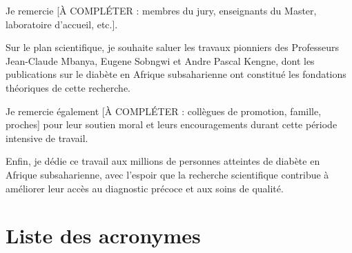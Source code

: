 \documentclass[12pt,a4paper,oneside]{report}
\begin{document}
\vspace{0.3cm}

Je remercie [À COMPLÉTER : membres du jury, enseignants du Master, laboratoire d'accueil, etc.].

\vspace{0.3cm}

Sur le plan scientifique, je souhaite saluer les travaux pionniers des Professeurs Jean-Claude Mbanya, Eugene Sobngwi et Andre Pascal Kengne, dont les publications sur le diabète en Afrique subsaharienne ont constitué les fondations théoriques de cette recherche.

\vspace{0.3cm}

Je remercie également [À COMPLÉTER : collègues de promotion, famille, proches] pour leur soutien moral et leurs encouragements durant cette période intensive de travail.

\vspace{0.3cm}

Enfin, je dédie ce travail aux millions de personnes atteintes de diabète en Afrique subsaharienne, avec l'espoir que la recherche scientifique contribue à améliorer leur accès au diagnostic précoce et aux soins de qualité.

\clearpage

\tableofcontents
\clearpage

\listoffigures
{}
\clearpage

\listoftables
{}
\clearpage

\chapter*{Liste des acronymes}
\end{document}
